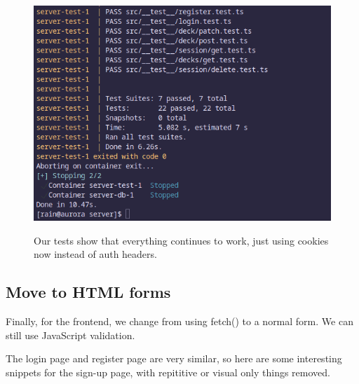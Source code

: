 \documentclass{report}
\begin{document}
\begin{figure}[H]
  \includegraphics[width=\linewidth]{./media/development/backend/tests/cookie-refactor.png}
  \label{fig:tests3}
  \caption{Our tests show that everything continues to work, just using cookies now instead of auth headers.}
\end{figure}

\subsection{Move to HTML forms}
Finally, for the frontend, we change from using fetch() to a normal form. We can still use JavaScript validation.

The login page and register page are very similar, so here are some interesting snippets for the sign-up page, with repititive or visual only things removed.
\end{document}
